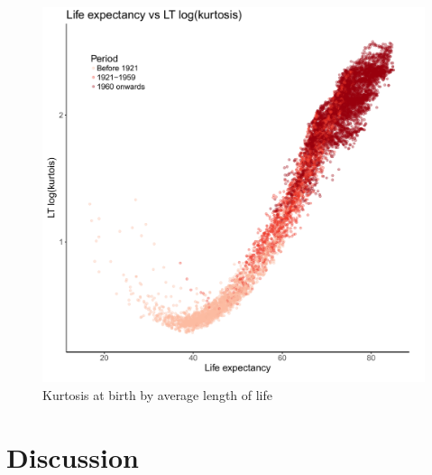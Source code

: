 \documentclass{article}
\begin{document}
\begin{figure}
\caption{Kurtosis at birth by average length of life}
\centering
\includegraphics[scale=.5]{Figures/F1_Kurtosis}
\end{figure}

\FloatBarrier
\section*{Discussion}


   
\end{document}
